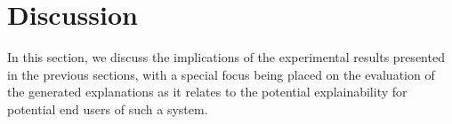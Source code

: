 \documentclass{article}
\begin{document}
		
        


\section{Discussion}\label{sec:discussion}
In this section, we discuss the implications of the experimental results presented in the previous sections, with a special focus being placed on the evaluation of the generated explanations as it relates to the potential explainability for potential end users of such a system.
		
\end{document}
